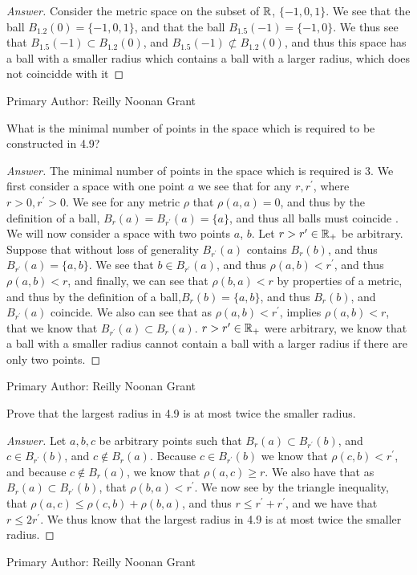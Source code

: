 \begin{proof}[Answer]
  Consider the metric space on the subset of $\mathbb{R}$, $\{-1,0,1\}$. We
  see that the ball $B_{1.2}(0) = \{-1,0,1\}$, and that the ball 
  $B_{1.5}(-1)=\{-1,0\}$. We thus see that $B_{1.5}(-1) \subset
  B_{1.2}(0)$, and $B_{1.5}(-1) \not\subset B_{1.2}(0)$, and thus this
  space has a ball with a smaller radius which contains a ball with a
  larger radius, which does not coincidde with it
\end{proof}

Primary Author: Reilly Noonan Grant

\begin{minorEx}%
    What is the minimal number of points in the space which is required to be
    constructed in 4.9?
\end{minorEx}


\begin{proof}[Answer]
  The minimal number of points in the space which is required is
  $3$. We first consider a space with one point $a$ we see that for
  any $r,r^\prime$, where $r > 0,r^\prime > 0$. We see for any metric
  $\rho$ that $\rho(a,a)=0$, and thus by the
  definition of a ball, $B_r(a)= B_{r^\prime}(a)=\{a\}$, and thus all
  balls must coincide . We will now consider a space with two
  points $a$, $b$. Let $r>r^\prime\in \mathbb{R}_+$ be arbitrary. Suppose
  that without loss of generality $B_{r^\prime}(a)$ contains $B_{r}(b)$, and thus
  $B_{r^\prime}(a)=\{a,b\}$.
 We see that $b\in
  B_{r^\prime}(a)$, and thus $\rho(a,b)<r^\prime$, and thus
  $\rho(a,b)<r$, and finally, we can see that $\rho(b,a)<r$ by
  properties of a metric, and thus by the definition of a
  ball,$B_{r}(b)=\{a,b\}$, and thus $B_{r}(b)$, and $B_{r^\prime}(a)$
  coincide. We also can see that as
  $\rho(a,b)<r^\prime$, implies $\rho(a,b)<r$, that we know that
  $ B_{r^\prime}(a) \subset B_{r}(a)$. $r>r^\prime\in \mathbb{R}_+$ were
  arbitrary, we know that a ball with a smaller radius cannot contain
  a ball with a larger radius if there are only two points.
\end{proof}
Primary Author: Reilly Noonan Grant

\begin{minorEx}%
    Prove that the largest radius in 4.9 is at most twice the smaller radius.
\end{minorEx}

\begin{proof}[Answer]
  Let $a,b,c$ be arbitrary points such that $B_r(a) \subset B_{r^\prime}(b)$,
  and $c \in B_{r^\prime}(b)$, and $c \notin
  B_r(a)$. Because $c \in B_{r^\prime}(b)$ we know that 
  $\rho(c,b)<r^\prime$, and because
  $c \notin  B_r(a)$, we know that $\rho(a,c)\geq r$. We also have
  that as $B_r(a) \subset B_{r^\prime}(b)$, that
  $\rho(b,a)<r^\prime$. We now see by the triangle inequality, that 
  $\rho(a,c) \leq \rho(c,b)+ \rho(b,a)$, and thus 
  $r \leq r^\prime +r^\prime$, and we have that $r\leq 2r^\prime$. We
  thus know that the largest radius in 4.9 is at most twice the
  smaller radius.
\end{proof}

Primary Author: Reilly Noonan Grant
